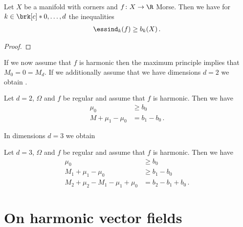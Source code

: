 \begin{corollary}
  Let $X$ be a manifold with corners and $f\colon X\to\R$ Morse. Then we have for $k\in\brk[c]*{0,\dots,d}$
  the inequalities
  \begin{align*}
    \essind_k(f)\geq b_k(X)\,.
  \end{align*}
\end{corollary}
\begin{proof}
\end{proof}
If we now assume that $f$ is harmonic then the maximum principle implies that
$M_0=0=M_d$.
If we additionally assume that we have dimensions $d=2$ we obtain \cite[Corollary 10.1]{Morse1969}.
\begin{corollary}[Morse inequalities for $f$ harmonic, $d=2$]
  Let $d=2$, $\Omega$ and $f$ be regular and assume that $f$ is harmonic. Then we have
  \begin{align*}
    \mu_0&\geq b_0 \\
    M+\mu_1-\mu_0&=b_1-b_0\,.
  \end{align*}
\end{corollary}
In dimensions $d=3$ we obtain \cite[Corollary 10.2]{Morse1969}
\begin{corollary}[Morse inequalities for $f$ harmonic, $d=3$]
  Let $d=3$, $\Omega$ and $f$ be regular and assume that $f$ is harmonic. Then we have
  \begin{align*}
    \mu_0&\geq b_0 \\
    M_1+\mu_1-\mu_0&\geq b_1-b_0 \\
    M_2+\mu_2-M_1-\mu_1+\mu_0&= b_2-b_1+b_0\,.
  \end{align*}
\end{corollary}

\section{On harmonic vector fields}

